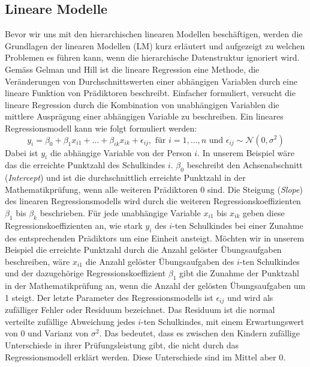 \documentclass[12pt]{article}\usepackage[]{graphicx}\usepackage[]{color}
\begin{document}
\subsection{Lineare Modelle} \label{section:linear_model}
Bevor wir uns mit den hierarchischen linearen Modellen beschäftigen, werden die Grundlagen der linearen Modellen (LM) kurz erläutert und aufgezeigt zu welchen Problemen es führen kann, wenn die hierarchische Datenstruktur ignoriert wird. Gemäss Gelman und Hill \citeyearpar{andrew_data} ist die lineare Regression eine Methode, die Veränderungen von Durchschnittswerten einer abhängigen Variablen durch eine lineare Funktion von Prädiktoren beschreibt. Einfacher formuliert, versucht die lineare Regression durch die Kombination von unabhängigen Variablen die mittlere Ausprägung einer abhängigen Variable zu beschreiben. Ein lineares Regressionsmodell kann wie folgt formuliert werden:
\begin{equation} \label{eq:ols_model}
y_{i} = \beta_{0} + \beta_{1}x_{i1} + \dots + \beta_{ik}x_{ik} + \epsilon_{ij}, \text{ für } i = 1, \dots, n \text{ und } \epsilon_{ij} \sim \mathcal{N}(0,\sigma^{2})
\end{equation}
Dabei ist $y_{i}$ die abhängige Variable von der Person $i$. In unserem Beispiel wäre das die erreichte Punktzahl des Schulkindes $i$. $\beta_0$ beschreibt den Achsenabschnitt (\textit{Intercept}) und ist die durchschnittlich erreichte Punktzahl in der Mathematikprüfung, wenn alle weiteren Prädiktoren 0 sind. Die Steigung (\textit{Slope}) des linearen Regressionsmodells wird durch die weiteren Regressionskoeffizienten $\beta_{1}$ bis $\beta_{k}$ beschrieben. Für jede unabhängige Variable $x_{i1}$ bis $x_{ik}$ geben diese Regressionskoeffizienten an, wie stark $y_{i}$ des $i$-ten Schulkindes bei einer Zunahme des entsprechenden Prädiktors um eine Einheit ansteigt. Möchten wir in unserem Beispiel die erreichte Punktzahl durch die Anzahl gelöster Übungsaufgaben beschreiben, wäre $x_{i1}$ die Anzahl gelöster Übungsaufgaben des $i$-ten Schulkindes und der dazugehörige Regressionskoeffizient $\beta_{1}$ gibt die Zunahme der Punktzahl in der Mathematikprüfung an, wenn die Anzahl der gelösten Übungsaufgaben um 1 steigt. Der letzte Parameter des Regressionsmodells ist $\epsilon_{ij}$ und wird als zufälliger Fehler oder Residuum bezeichnet. Das Residuum ist die normal verteilte zufällige Abweichung jedes $i$-ten Schulkindes, mit einem Erwartungswert von 0 und Varianz von $\sigma^{2}$. Das bedeutet, dass es zwischen den Kindern zufällige Unterschiede in ihrer Prüfungsleistung gibt, die nicht durch das Regressionsmodell erklärt werden. Diese Unterschiede sind im Mittel aber 0. 
\end{document}
